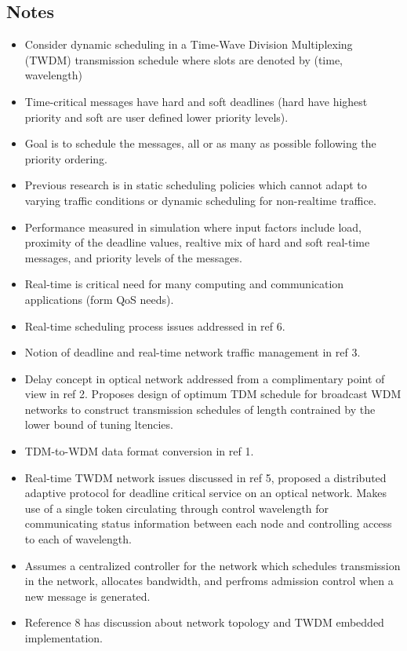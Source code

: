 \documentclass{article}
\begin{document}
\subsection{Notes}
\begin{itemize}
    \item Consider dynamic scheduling in a Time-Wave Division Multiplexing (TWDM) transmission schedule where slots are denoted by (time, wavelength)
    \item Time-critical messages have hard and soft deadlines (hard have highest priority and soft are user defined lower priority levels).
    \item Goal is to schedule the messages, all or as many as possible following the priority ordering.
    \item Previous research is in static scheduling policies which cannot adapt to varying traffic conditions or dynamic scheduling for non-realtime traffice.
    \item Performance measured in simulation where input factors include load, proximity of the deadline values, realtive mix of hard and soft real-time messages, and priority levels of the messages.
    \item Real-time is critical need for many computing and communication applications (form QoS needs).
    \item Real-time scheduling process issues addressed in ref 6.
    \item Notion of deadline and real-time network traffic management in ref 3.
    \item Delay concept in optical network addressed from a complimentary point of view in ref 2.  Proposes design of optimum TDM schedule for broadcast WDM networks to construct transmission schedules of length contrained by the lower bound of tuning ltencies.
    \item TDM-to-WDM data format conversion in ref 1.
    \item Real-time TWDM network issues discussed in ref 5, proposed a distributed adaptive protocol for deadline critical service on an optical network.  Makes use of a single token circulating through control wavelength for communicating status information between each node and controlling access to each of wavelength.
    \item Assumes a centralized controller for the network which schedules transmission in the network, allocates bandwidth, and perfroms admission control when a new message is generated.
    \item Reference 8 has discussion about network topology and TWDM embedded implementation.

\end{itemize}
\end{document}
